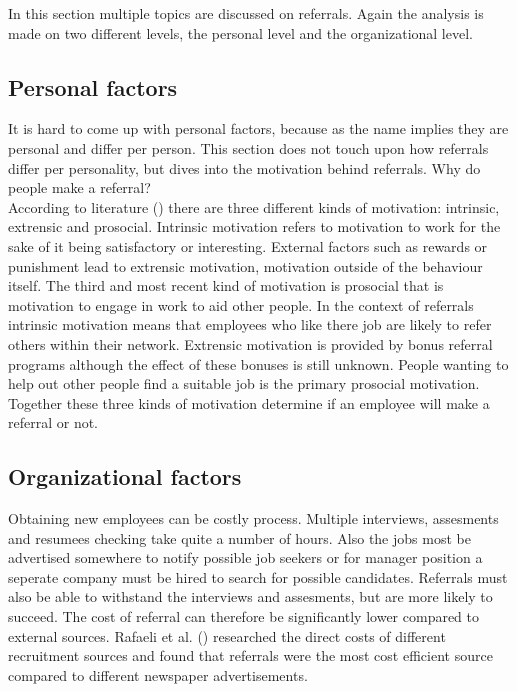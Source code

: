 \documentclass[Main.tex]{subfiles}
\begin{document}
In this section multiple topics are discussed on referrals. Again the analysis is made on two different levels, the personal level and the organizational level. 

\subsection*{Personal factors}

It is hard to come up with personal factors, because as the name implies they are personal and differ per person. This section does not touch upon how referrals differ per personality, but dives into the motivation behind referrals. Why do people make a referral? \\

According to literature (\cite{motives}) there are three different kinds of motivation: intrinsic, extrensic and prosocial. Intrinsic motivation refers to motivation to work for the sake of it being satisfactory or interesting. External factors such as rewards or punishment lead to extrensic motivation, motivation outside of the behaviour itself. The third and most recent kind of motivation is prosocial that is motivation to engage in work to aid other people. In the context of referrals intrinsic motivation means that employees who like there job are likely to refer others within their network. Extrensic motivation is provided by bonus referral programs although the effect of these bonuses is still unknown. People wanting to help out other people find a suitable job is the primary prosocial motivation. Together these three kinds of motivation determine if an employee will make a referral or not.


\subsection*{Organizational factors}

Obtaining new employees can be costly process. Multiple interviews, assesments and resumees checking take quite a number of hours. Also the jobs most be advertised somewhere to notify possible job seekers or for manager position a seperate company must be hired to search for possible candidates. Referrals  must also be able to withstand the interviews and assesments, but are more likely to succeed. The cost of referral can therefore be significantly lower compared to external sources. Rafaeli et al. (\cite{fourth}) researched the direct costs of different recruitment sources and found that referrals were the most cost efficient source compared to different newspaper advertisements. \\
\end{document}
